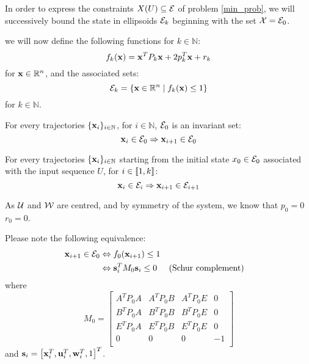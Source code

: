 In order to express the constraints $X(U) \subseteq \mathcal{E}$ of problem \ref{min_prob}, we will successively bound the state in ellipsoids $\mathcal{E}_k$ beginning with the set $\mathcal{X} = \mathcal{E}_0$.

we will now define the following functions for $k \in \mathbb{N}$:
\begin{equation}
f_k( \mathbf{x}) =  \mathbf{x}^T P_k  \mathbf{x} + 2 p_k^T  \mathbf{x} + r_k
\end{equation}
for $ \mathbf{x} \in \mathbb{R}^n$, and the associated sets:
\begin{equation}
\mathcal{E}_k = \{  \mathbf{x} \in \mathbb{R}^n \mid f_k( \mathbf{x}) \leq 1 \}
\end{equation}
for $k\in\mathbb{N}$.

For every trajectories $\{ \mathbf{x}_i\}_{i\in \mathbb{N}}$, for $i \in \mathbb{N}$, $\mathcal{E}_0$ is an invariant set:
\begin{equation}\label{inv_ellipse}
 \mathbf{x}_i \in \mathcal{E}_0 \Rightarrow  \mathbf{x}_{i+1} \in \mathcal{E}_0
\end{equation}

For every trajectories $\{ \mathbf{x}_i\}_{i \in \mathbb{N}}$ starting from the initial state $x_0 \in \mathcal{E}_0$ associated with the input sequence $U$, for $i \in \left \llbracket 1,k \right \rrbracket$:
\begin{equation} \label{next_ellipse}
 \mathbf{x}_i \in \mathcal{E}_i \Rightarrow  \mathbf{x}_{i+1} \in \mathcal{E}_{i+1}
\end{equation}

As $\mathcal{U}$ and $\mathcal{W}$ are centred, and by symmetry of the system, we know that $p_0 = 0$$r_0 = 0$.

Please note the following equivalence:
\begin{align*}
 \mathbf{x}_{i+1} \in \mathcal{E}_0 
&\Leftrightarrow f_0( \mathbf{x}_{i+1}) \leq 1 \\
&\Leftrightarrow  \mathbf{s}_i^T M_0  \mathbf{s}_i \leq 0 && \text{(Schur complement)}
\end{align*}
where
\begin{equation}
M_0 =
\begin{bmatrix}
A^T P_0 A & A^T P_0 B & A^T P_0 E & 0 \\
B^T P_0 A & B^T P_0 B & B^T P_0 E & 0 \\
E^T P_0 A & E^T P_0 B & E^T P_0 E & 0 \\
0       & 0       & 0       & -1 \\
\end{bmatrix}
\end{equation}
and $ \mathbf{s}_i = \left[  \mathbf{x}_i^T,  \mathbf{u}_i^T,  \mathbf{w}_i^T, 1 \right]^T$.

